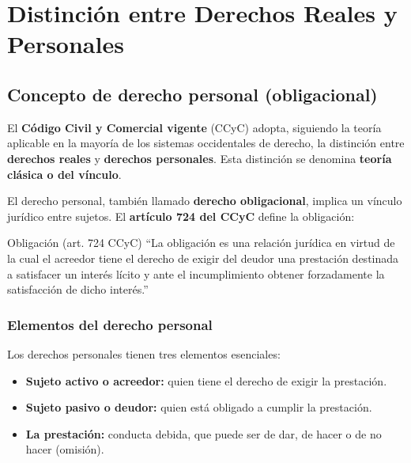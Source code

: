 \documentclass[12pt,oneside]{book}
\begin{document}
\tableofcontents


\chapter[Derechos reales y personales]{Distinci\'on entre Derechos Reales y Personales}

\section{Concepto de derecho personal (obligacional)}

El \textbf{C\'odigo Civil y Comercial vigente} (CCyC) adopta, siguiendo la teor\'ia aplicable en la mayor\'ia de los sistemas occidentales de derecho, la distinci\'on entre \textbf{derechos reales} y \textbf{derechos personales}. Esta distinci\'on se denomina \textbf{teor\'ia cl\'asica o del v\'inculo}.

El derecho personal, tambi\'en llamado \textbf{derecho obligacional}, implica un v\'inculo jur\'idico entre sujetos. El \textbf{art\'iculo 724 del CCyC} define la obligaci\'on:

\begin{definition}{Obligaci\'on (art. 724 CCyC)}
``La obligaci\'on es una relaci\'on jur\'idica en virtud de la cual el acreedor tiene el derecho de exigir del deudor una prestaci\'on destinada a satisfacer un inter\'es l\'icito y ante el incumplimiento obtener forzadamente la satisfacci\'on de dicho inter\'es.''
\end{definition}

\subsection{Elementos del derecho personal}

Los derechos personales tienen tres elementos esenciales:

\begin{itemize}
    \item \textbf{Sujeto activo o acreedor:} quien tiene el derecho de exigir la prestaci\'on.
    \item \textbf{Sujeto pasivo o deudor:} quien est\'a obligado a cumplir la prestaci\'on.
    \item \textbf{La prestaci\'on:} conducta debida, que puede ser de dar, de hacer o de no hacer (omisi\'on).
\end{itemize}
\end{document}
